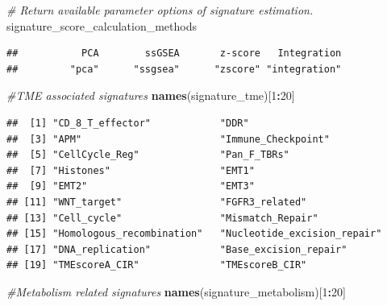 \documentclass[
  12pt,
]{book}
\newenvironment{Shaded}{\begin{snugshade}}{\end{snugshade}}
\newcommand{\CommentTok}[1]{\textcolor[rgb]{0.56,0.35,0.01}{\textit{#1}}}
\newcommand{\DecValTok}[1]{\textcolor[rgb]{0.00,0.00,0.81}{#1}}
\newcommand{\FunctionTok}[1]{\textcolor[rgb]{0.13,0.29,0.53}{\textbf{#1}}}
\newcommand{\NormalTok}[1]{#1}
\newcommand{\SpecialCharTok}[1]{\textcolor[rgb]{0.81,0.36,0.00}{\textbf{#1}}}
\begin{document}
\begin{Shaded}
\begin{Highlighting}[]
\CommentTok{\# Return available parameter options of signature estimation.}
\NormalTok{signature\_score\_calculation\_methods}
\end{Highlighting}
\end{Shaded}

\begin{verbatim}
##           PCA        ssGSEA       z-score   Integration 
##         "pca"      "ssgsea"      "zscore" "integration"
\end{verbatim}

\begin{Shaded}
\begin{Highlighting}[]
\CommentTok{\#TME associated signatures}
\FunctionTok{names}\NormalTok{(signature\_tme)[}\DecValTok{1}\SpecialCharTok{:}\DecValTok{20}\NormalTok{]}
\end{Highlighting}
\end{Shaded}

\begin{verbatim}
##  [1] "CD_8_T_effector"            "DDR"                       
##  [3] "APM"                        "Immune_Checkpoint"         
##  [5] "CellCycle_Reg"              "Pan_F_TBRs"                
##  [7] "Histones"                   "EMT1"                      
##  [9] "EMT2"                       "EMT3"                      
## [11] "WNT_target"                 "FGFR3_related"             
## [13] "Cell_cycle"                 "Mismatch_Repair"           
## [15] "Homologous_recombination"   "Nucleotide_excision_repair"
## [17] "DNA_replication"            "Base_excision_repair"      
## [19] "TMEscoreA_CIR"              "TMEscoreB_CIR"
\end{verbatim}

\begin{Shaded}
\begin{Highlighting}[]
\CommentTok{\#Metabolism related signatures}
\FunctionTok{names}\NormalTok{(signature\_metabolism)[}\DecValTok{1}\SpecialCharTok{:}\DecValTok{20}\NormalTok{]}
\end{Highlighting}
\end{Shaded}
\end{document}
